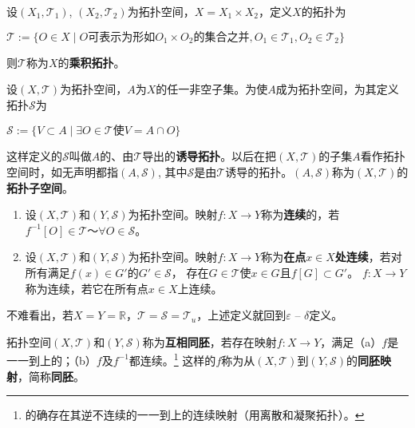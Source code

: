\begin{example}
设$(X_1, \mathscr{T}_1)$, $(X_2, \mathscr{T}_2)$为拓扑空间，$X = X_1 \times X_2$，定义$X$的拓扑为

$\mathscr{T} := \{O \in X \mid O\text{可表示为形如}O_1 \times O_2\text{的集合之并}, O_1 \in \mathscr{T}_1, O_2 \in \mathscr{T}_2\}$

则$\mathscr{T}$称为$X$的\textbf{乘积拓扑}。
\end{example}

\begin{example}
设$(X, \mathscr{T})$为拓扑空间，$A$为$X$的任一非空子集。为使$A$成为拓扑空间，为其定义拓扑$\mathscr{S}$为

$\mathscr{S} := \{V \subset A \mid \exists O \in \mathscr{T} \text{使} V = A \cap O\}$

这样定义的$\mathscr{S}$叫做$A$的、由$\mathscr{T}$导出的\textbf{诱导拓扑}。以后在把$(X, \mathscr{T})$的子集$A$看作拓扑空间时，如无声明都指$(A, \mathscr{S})$,
其中$\mathscr{S}$是由$\mathscr{T}$诱导的拓扑。$(A, \mathscr{S})$称为$(X, \mathscr{T})$的\textbf{拓扑子空间}。
\end{example}

\begin{definition}
\begin{enumerate}[（a）]
\item 设$(X, \mathscr{T})$和$(Y, \mathscr{S})$为拓扑空间。映射$f \colon X \to Y$称为\textbf{连续}的，若$f^{-1}[O] \in \mathscr{T} ～ \forall O \in \mathscr{S}$。
\item 设$(X, \mathscr{T})$和$(Y, \mathscr{S})$为拓扑空间。映射$f \colon X \to Y$称为\textbf{在点$x \in X$处连续}，若对所有满足$f(x) \in G'$的$G' \in \mathscr{S}$， 存在$G \in \mathscr{T}$使$x \in G$且$f[G] \subset G'$。
$f \colon X \to Y$称为连续，若它在所有点$x \in X$上连续。
\end{enumerate}
\end{definition}

\begin{note}
不难看出，若$X = Y = \mathbb{R}$，$\mathscr{T} = \mathscr{S} = \mathscr{T}_u$，上述定义就回到$\varepsilon$ -- $\delta$定义。
\end{note}

\begin{definition}
拓扑空间$(X, \mathscr{T})$和$(Y, \mathscr{S})$称为\textbf{互相同胚}，若存在映射$f \colon X \to Y$，满足（a）$f$是一一到上的；（b）$f$及$f^{-1}$都连续。\footnote{
的确存在其逆不连续的一一到上的连续映射（用离散和凝聚拓扑）。
}
这样的$f$称为从$(X, \mathscr{T})$到$(Y, \mathscr{S})$的\textbf{同胚映射}，简称\textbf{同胚}。   
\end{definition}

